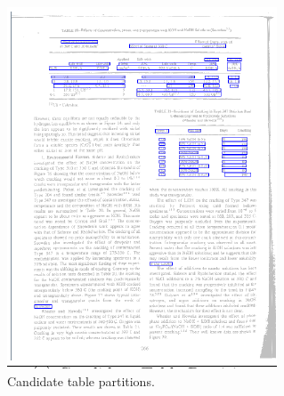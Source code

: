 \begin{figure}
\begin{subfigure}{0.30\textwidth}
\includegraphics[width=\linewidth]{img/tableDetection/tableDetectionCandidate.pdf}
\caption{Candidate table partitions.}
\label{fig:tessTableDet3}
\end{subfigure}
\\
\begin{subfigure}{0.30\textwidth}

\end{subfigure}
\end{figure}
